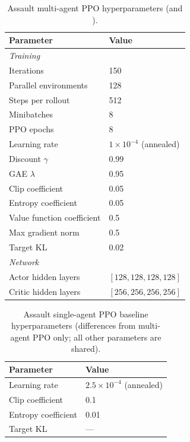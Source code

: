 \begin{table}[h]
\centering
\begin{tabular}{ll}
\toprule
Parameter & Value \\
\midrule
\multicolumn{2}{l}{\textit{Training}} \\
Iterations & 150 \\
Parallel environments & 128 \\
Steps per rollout & 512 \\
Minibatches & 8 \\
PPO epochs & 8 \\
Learning rate & $1 \times 10^{-4}$ (annealed) \\
Discount $\gamma$ & 0.99 \\
GAE $\lambda$ & 0.95 \\
Clip coefficient & 0.05 \\
Entropy coefficient & 0.05 \\
Value function coefficient & 0.5 \\
Max gradient norm & 0.5 \\
Target KL & 0.02 \\
\midrule
\multicolumn{2}{l}{\textit{Network}} \\
Actor hidden layers & $[128, 128, 128, 128]$ \\
Critic hidden layers & $[256, 256, 256, 256]$ \\
\bottomrule
\end{tabular}
\caption{Assault multi-agent PPO hyperparameters (\allpay and \poorman).}
\end{table}

\begin{table}[h]
\centering
\begin{tabular}{ll}
\toprule
Parameter & Value \\
\midrule
Learning rate & $2.5 \times 10^{-4}$ (annealed) \\
Clip coefficient & 0.1 \\
Entropy coefficient & 0.01 \\
Target KL & --- \\
\bottomrule
\end{tabular}
\caption{Assault single-agent PPO baseline hyperparameters (differences from multi-agent PPO only; all other parameters are shared).}
\end{table}

